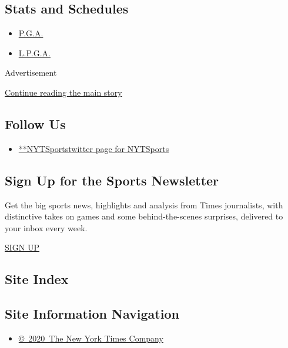 \hypertarget{stats-and-schedules}{%
\subsection{Stats and Schedules}\label{stats-and-schedules}}

\begin{itemize}
\tightlist
\item
  \protect\hyperlink{}{P.G.A.}
\item
  \protect\hyperlink{}{L.P.G.A.}
\end{itemize}

Advertisement

\protect\hyperlink{after-mktg}{Continue reading the main story}

\hypertarget{follow-us}{%
\subsection{Follow Us}\label{follow-us}}

\begin{itemize}
\tightlist
\item
  \href{https://twitter.com/NYTSports}{**NYTSportstwitter page for
  NYTSports}
\end{itemize}

\hypertarget{sign-up-for-the-sports-newsletter}{%
\subsection{Sign Up for the Sports
Newsletter}\label{sign-up-for-the-sports-newsletter}}

Get the big sports news, highlights and analysis from Times journalists,
with distinctive takes on games and some behind-the-scenes surprises,
delivered to your inbox every week.

\href{/newsletters/signup/SP}{SIGN UP}

\hypertarget{site-index}{%
\subsection{Site Index}\label{site-index}}

\hypertarget{site-information-navigation}{%
\subsection{Site Information
Navigation}\label{site-information-navigation}}

\begin{itemize}
\tightlist
\item
  \href{https://help.nytimes.com/hc/en-us/articles/115014792127-Copyright-notice}{©~2020~The
  New York Times Company}
\end{itemize}

